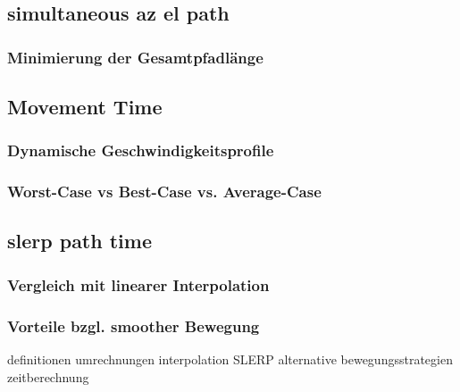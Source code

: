 \subsection{simultaneous az el path}

\subsubsection{Minimierung der Gesamtpfadlänge}

\subsection{Movement Time}

\subsubsection{Dynamische Geschwindigkeitsprofile}
\subsubsection{Worst-Case vs Best-Case vs. Average-Case}

\subsection{slerp path time}

\subsubsection{Vergleich mit linearer Interpolation}
\subsubsection{Vorteile bzgl. smoother Bewegung}

definitionen
umrechnungen
interpolation SLERP
alternative bewegungsstrategien
zeitberechnung